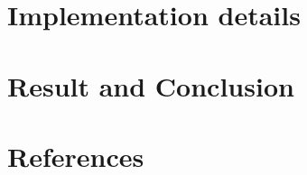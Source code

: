 \documentclass[12pt,a4paper]{report}
\begin{document}
\chapter{Implementation details}
\label{implementation details}


\chapter{Result and Conclusion}
\label{Result and Conclusion}


\chapter*{References}
\label{references}

\end{document}
